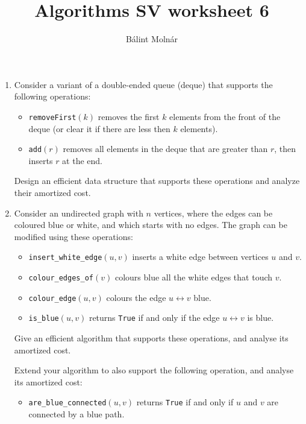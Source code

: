 \documentclass{article}
\title{{Algorithms SV worksheet 6}}
\author{Bálint Molnár}
\begin{document}
\maketitle
 


\begin{enumerate}
\item 
Consider a variant of a double-ended queue (deque) that supports the following operations:

\begin{itemize}
    \item \texttt{removeFirst}$(k)$ removes the first $k$ elements from the front of the deque (or clear it if there are less then $k$ elements).
    \item \texttt{add}$(r)$ removes all elements in the deque that are greater than $r$, then inserts $r$ at the end.
\end{itemize}

Design an efficient data structure that supports these operations and analyze their amortized cost.

\item
    Consider an undirected graph with $n$ vertices, where the edges can be coloured blue or white, and which starts with no edges. The graph can be modified using these operations:

\begin{itemize}
    \item \texttt{insert\_white\_edge}$(u,v)$ inserts a white edge between vertices $u$ and $v$.
    \item \texttt{colour\_edges\_of}$(v)$ colours blue all the white edges that touch $v$.
    \item \texttt{colour\_edge}$(u,v)$ colours the edge $u \leftrightarrow v$ blue.
    \item \texttt{is\_blue}$(u,v)$ returns \texttt{True} if and only if the edge $u \leftrightarrow v$ is blue.
\end{itemize}

Give an efficient algorithm that supports these operations, and analyse its amortized cost.

Extend your algorithm to also support the following operation, and analyse its amortized cost:

\begin{itemize}
    \item \texttt{are\_blue\_connected}$(u,v)$ returns \texttt{True} if and only if $u$ and $v$ are connected by a blue path.
\end{itemize}


\end{enumerate}
\end{document}
